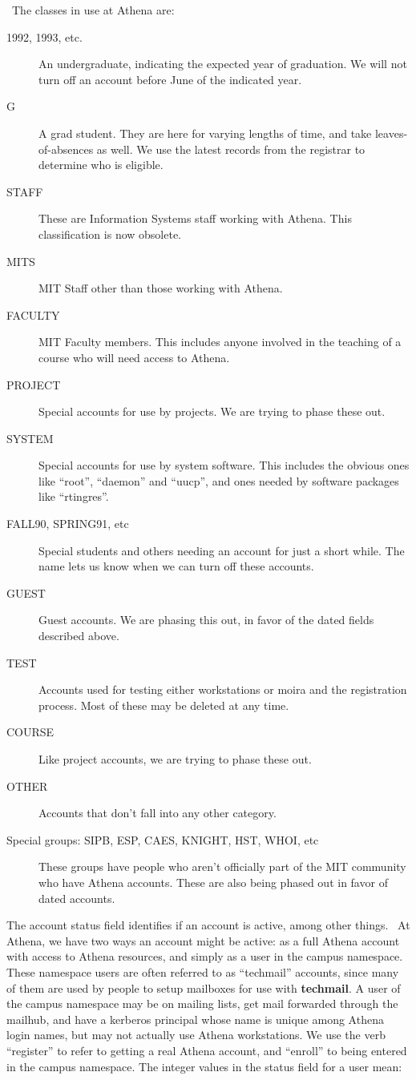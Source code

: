\athena\ The classes in use at Athena are:
\label{accountclass}
\begin{description}
\item[1992, 1993, etc.] An undergraduate, indicating the expected year of
graduation.  We will not turn off an account before June of the
indicated year.
\item[G] A grad student.  They are here for varying lengths of time, and
take leaves-of-absences as well.  We use the latest records from the
registrar to determine who is eligible.
\item[STAFF] These are Information Systems staff working with Athena.
This classification is now obsolete.
\item[MITS] MIT Staff other than those working with Athena.
\item[FACULTY] MIT Faculty members.  This includes anyone involved in the
teaching of a course who will need access to Athena.
\item[PROJECT] Special accounts for use by projects.  We are trying to phase
these out.
\item[SYSTEM] Special accounts for use by system software.  This includes
the obvious ones like ``root'', ``daemon'' and ``uucp'', and ones needed by
software packages like ``rtingres''.
\item[FALL90, SPRING91, etc] Special students and others needing an account
for just a short while.  The name lets us know when we can turn off
these accounts.
\item[GUEST] Guest accounts.  We are phasing this out, in favor of
the dated fields described above.
\item[TEST] Accounts used for testing either workstations or moira and the
registration process.  Most of these may be deleted at any time.
\item[COURSE] Like project accounts, we are trying to phase these out.
\item[OTHER] Accounts that don't fall into any other category.
\item[Special groups: SIPB, ESP, CAES, KNIGHT, HST, WHOI, etc] These
groups have people who aren't officially part of the MIT community who
have Athena accounts.  These are also being phased out in favor of
dated accounts.
\end{description}

 The account status field identifies if an account is
active, among other things.  \athena\ At Athena, we have two ways an
account might be active: as a full Athena account with access to
Athena resources, and simply as a user in the campus namespace.
 These namespace users are often referred to as
``techmail'' accounts, since many of them are used by people to setup
mailboxes for use with {\bf techmail}.  A user of the campus namespace
may be on mailing lists, get mail forwarded through the mailhub, and
have a kerberos principal whose name is unique among Athena login
names, but may not actually use Athena workstations.
 We use the verb ``register'' to refer
to getting a real Athena account, and ``enroll'' to being entered in
the campus namespace.  The integer values in the status field for a
user mean:


